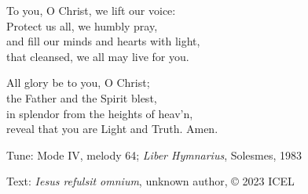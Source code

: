 \hymn



\begin{underhymnverse}
To you, O Christ, we lift our voice:\\
Protect us all, we humbly pray,\\
and fill our minds and hearts with light,\\
that cleansed, we all may live for you.

All glory be to you, O Christ;\\
the Father and the Spirit blest,\\
in splendor from the heights of heav’n,\\
reveal that you are Light and Truth. Amen.
\end{underhymnverse}


\begin{hymnsource}
Tune: Mode IV, melody 64; \emph{Liber Hymnarius}, Solesmes, 1983

Text: \emph{Iesus refulsit omnium}, unknown author, © 2023 ICEL
\end{hymnsource}
